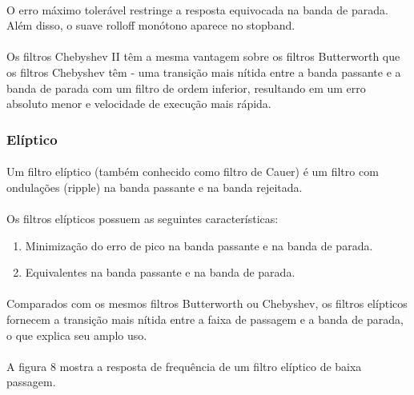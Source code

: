 \documentclass[12pt,fleqn]{article}
\begin{document}
\paragraph{} O erro máximo tolerável restringe a resposta equivocada na banda de parada. Além disso, o suave rolloff monótono aparece no stopband.

\paragraph{} Os filtros Chebyshev II têm a mesma vantagem sobre os filtros Butterworth que os filtros Chebyshev têm - uma transição mais nítida entre a banda passante e a banda de parada com um filtro de ordem inferior, resultando em um erro absoluto menor e velocidade de execução mais rápida.

\subsubsection{Elíptico}
\paragraph{} Um filtro elíptico (também conhecido como filtro de Cauer) é um filtro com ondulações (ripple) na banda passante e na banda rejeitada. 

\paragraph{} Os filtros elípticos possuem as seguintes características:
\begin{enumerate}
    \item Minimização do erro de pico na banda passante e na banda de parada.
    \item Equivalentes na banda passante e na banda de parada.
    \\
\end{enumerate}
\newpage
\paragraph{} Comparados com os mesmos filtros Butterworth ou Chebyshev, os filtros elípticos fornecem a transição mais nítida entre a faixa de passagem e a banda de parada, o que explica seu amplo uso.
\\
\paragraph{} A figura 8 mostra a resposta de frequência de um filtro elíptico de baixa passagem.
\end{document}
